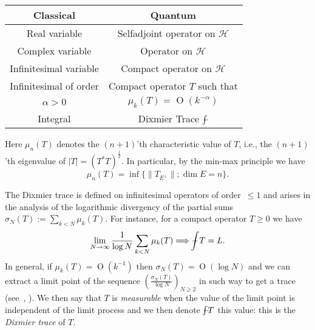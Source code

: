 \documentclass[leqno, 10pt]{amsart}
\theoremstyle{remark}
\begin{document}
\begin{center}
    \begin{tabular}{c|c}  
        Classical & Quantum \\ \hline
        
      Real variable &  Selfadjoint operator on ${\ensuremath{\mathcal{H}}} $ \\  
    
       Complex variable & Operator on ${\ensuremath{\mathcal{H}}} $ \\
 Infinitesimal variable & Compact operator on ${\ensuremath{\mathcal{H}}} $ \\
    
       Infinitesimal of order  & Compact operator $T$ such that \\ 
                $\alpha>0$       &  $\mu_{k}(T)={\operatorname{{O}}}(k^{-\alpha})$\\
                 Integral & Dixmier Trace ${\ensuremath{-\hspace{-2,4ex}\int}}$ 
    \end{tabular}
\end{center}

Here $\mu_{n}(T)$ denotes the  $(n+1)$'th characteristic value of $T$, i.e., the $(n+1)$'th eigenvalue 
of $|T|=(T^{*}T)^{\frac12}$. In particular, by the min-max principle  we have 
\begin{equation}
    \mu_{n}(T)  =  \inf\{ \|T_{E^\perp}\|; \dim E=n\}.
\end{equation}

The Dixmier trace is defined on infinitesimal operators of order~$\leq 1$ and arises in the analysis of the logarithmic divergency of the partial 
sums $\sigma_{N}(T):=\sum_{k<N}\mu_{k}(T)$. For instance, for a compact operator $T\geq 0$ we have
\begin{equation}
    \lim_{N \rightarrow \infty}\frac{1}{\log N}\sum_{k<N}\mu_{k}(T) \Longrightarrow {\ensuremath{-\hspace{-2,4ex}\int}} T=L.
\end{equation}
In general, if $\mu_{k}(T)={\operatorname{{O}}}(k^{-1})$ then $\sigma_{N}(T)={\operatorname{{O}}}(\log N)$ and we can extract a limit point of the sequence 
$(\frac{\sigma_{N}(T)}{\log N})_{N\geq 2}$ in such way to get a trace (see~\cite{Di:ETNN}, \cite[Appendix A]{CM:LIFNCG}). We then say that $T$ is 
\emph{measurable} when the value of the limit point is 
independent of the limit process and we then denote ${\ensuremath{-\hspace{-2,4ex}\int}} T$ this value: this is the \emph{Dixmier trace} of $T$. 
\end{document}
